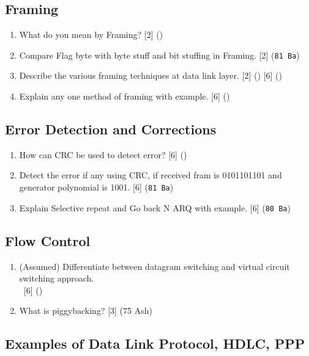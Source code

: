 \documentclass[12pt]{article}
\newcommand{\enter}{\\\textcolor{white}{1}}
\begin{document}
	\subsection{Framing}
		\begin{enumerate}[noitemsep, topsep=0pt]
			\item What do you mean by Framing? \hfill [2] ()

			\item Compare Flag byte with byte stuff and bit stuffing in Framing. \hfill [2] (\texttt{81 Ba})

			\item Describe the various framing techniques at data link layer. \hfill [2] (\bo{75 Ch}) [6] ()

			\item Explain any one method of framing with example. \hfill [6] ()
		\end{enumerate}

	\subsection{Error Detection and Corrections}
		\begin{enumerate}[noitemsep, topsep=0pt]
			\item How can CRC be used to detect error? \hfill [6] ()
			
			\item Detect the error if any using CRC, if received fram is 0101101101 and generator polynomial is 1001. \hfill [6] (\texttt{81 Ba})

			\item Explain Selective repeat and Go back N ARQ with example. \hfill [6] (\texttt{80 Ba})
		\end{enumerate}

	\subsection{Flow Control}
		\begin{enumerate}[noitemsep, topsep=0pt]
			\item (Assumed) Differentiate between datagram switching and virtual circuit switching approach.
			\enter\hfill [6] ()

			\item What is piggybacking? \hfill [3] (75 Ash)
		\end{enumerate}

	\subsection{Examples of Data Link Protocol, HDLC, PPP}
\end{document}
